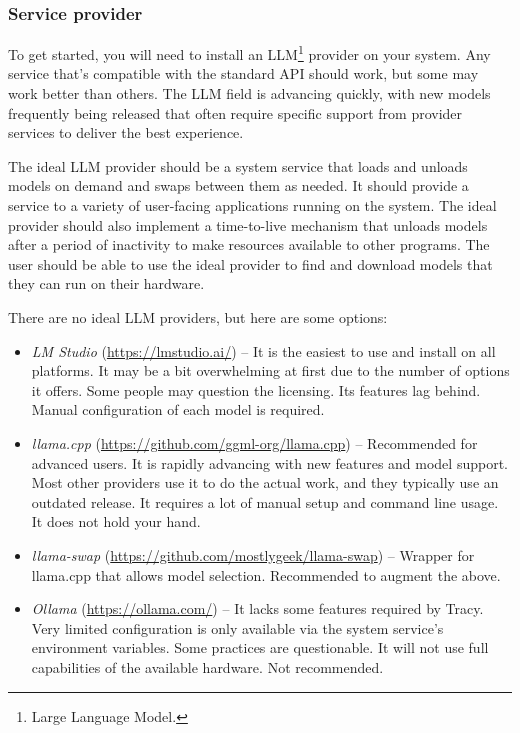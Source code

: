 \documentclass[hidelinks,titlepage,a4paper,twoside]{article}
\begin{document}
\subsubsection{Service provider}

To get started, you will need to install an LLM\footnote{Large Language Model.} provider on your system. Any service that's compatible with the standard API should work, but some may work better than others. The LLM field is advancing quickly, with new models frequently being released that often require specific support from provider services to deliver the best experience.

The ideal LLM provider should be a system service that loads and unloads models on demand and swaps between them as needed. It should provide a service to a variety of user-facing applications running on the system. The ideal provider should also implement a time-to-live mechanism that unloads models after a period of inactivity to make resources available to other programs. The user should be able to use the ideal provider to find and download models that they can run on their hardware.

There are no ideal LLM providers, but here are some options:

\begin{itemize}
\item \emph{LM Studio} (\url{https://lmstudio.ai/}) -- It is the easiest to use and install on all platforms. It may be a bit overwhelming at first due to the number of options it offers. Some people may question the licensing. Its features lag behind. Manual configuration of each model is required.
\item \emph{llama.cpp} (\url{https://github.com/ggml-org/llama.cpp}) -- Recommended for advanced users. It is rapidly advancing with new features and model support. Most other providers use it to do the actual work, and they typically use an outdated release. It requires a lot of manual setup and command line usage. It does not hold your hand.
\item \emph{llama-swap} (\url{https://github.com/mostlygeek/llama-swap}) -- Wrapper for llama.cpp that allows model selection. Recommended to augment the above.
\item \emph{Ollama} (\url{https://ollama.com/}) -- It lacks some features required by Tracy. Very limited configuration is only available via the system service's environment variables. Some practices are questionable. It will not use full capabilities of the available hardware. Not recommended.
\end{itemize}
\end{document}
